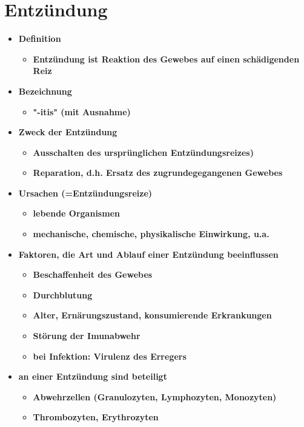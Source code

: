 \section{Entzündung}
	\begin{itemize}
		\item \textbf{Definition}
			\begin{itemize}
				\item \textbf{Entzündung ist Reaktion des Gewebes auf einen schädigenden Reiz}
			\end{itemize}
		\item \textbf{Bezeichnung}
			\begin{itemize}
				\item \textbf{"-itis" (mit Ausnahme)}
			\end{itemize}
		\item \textbf{Zweck der Entzündung}
			\begin{itemize}
				\item \textbf{Ausschalten des ursprünglichen Entzündungsreizes)}
				\item \textbf{Reparation, d.h. Ersatz des zugrundegegangenen Gewebes}
			\end{itemize}
		\item \textbf{Ursachen (=Entzündungsreize)}
			\begin{itemize}
				\item \textbf{lebende Organismen}
				\item \textbf{mechanische, chemische, physikalische Einwirkung, u.a.}
			\end{itemize}
		\item \textbf{Faktoren, die Art und Ablauf einer Entzündung beeinflussen}
			\begin{itemize}
				\item \textbf{Beschaffenheit des Gewebes}
				\item \textbf{Durchblutung}
				\item \textbf{Alter, Ernärungszustand, konsumierende Erkrankungen}
				\item \textbf{Störung der Imunabwehr}
				\item \textbf{bei Infektion: Virulenz des Erregers}
			\end{itemize}
		\item \textbf{an einer Entzündung sind beteiligt}
			\begin{itemize}
				\item \textbf{Abwehrzellen (Granulozyten, Lymphozyten, Monozyten)}
				\item \textbf{Thrombozyten, Erythrozyten}

\end{itemize}
\end{itemize}
